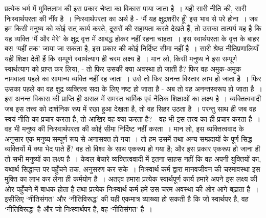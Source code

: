 प्रत्येक धर्म में मुक्तिलाभ की इस प्रकार चेष्टा का विकास पाया जाता है~। यही सारी नीति की, सारी निःस्वार्थपरता की नींव है~। निःस्वार्थपरता का अर्थ है - ‘मैं यह क्षुद्रशरीर हूँ’ इस भाव से परे होना~। जब हम किसी मनुष्य को कोई सत् कार्य करते, दूसरों की सहायता करते देखते हैं, तो उसका तात्पर्य यह है कि यह व्यक्ति ‘मैं और मेरे’ के क्षुद्र वृत्त में आबद्ध होकर नहीं रहना चाहता~। इस स्वार्थपरता के वृत्त के बाहर बस ‘यहीं तक’ जाया जा सकता है, इस प्रकार की कोई निर्दिष्ट सीमा नहीं है~। सारी श्रेष्ठ नीतिप्रणालियाँ यही शिक्षा देती हैं कि सम्पूर्ण स्वार्थत्याग ही चरम लक्ष्य है~। मान लो, किसी मनुष्य ने इस सम्पूर्ण स्वार्थत्याग को प्राप्त कर लिया, - तो फिर उसकी क्या अवस्था हो जाती है? फिर वह अमुक-अमुक नामवाला पहले का सामान्य व्यक्ति नहीं रह जाता~। उसे तो फिर अनन्त विस्तार लाभ हो जाता है~। फिर उसका पहले का वह क्षुद्र व्यक्तित्व सदा के लिए नष्ट हो जाता है - अब तो वह अनन्तस्वरूप हो जाता है~। इस अनन्त विकास की प्राप्ति ही असल में समस्त धार्मिक एवं नैतिक शिक्षाओं का लक्ष्य है~। व्यक्तित्ववादी जब इस तत्त्व को दार्शनिक रूप में रखा हुआ देखता है, तो वह सिहर उठता है~। परन्तु साथ ही जब वह स्वयं नीति का प्रचार करता है, तो आखिर वह क्या करता है? - वह भी इस तत्त्व का ही प्रचार करता है~। वह भी मनुष्य की निःस्वार्थपरता की कोई सीमा निर्दिष्ट नहीं करता~। मान लो, इस व्यक्तित्ववाद के अनुसार एक मनुष्य सम्पूर्ण रूप से अनासक्त हो गया~। तो हम उसमें तथा अन्य सम्प्रदायों के पूर्ण सिद्ध व्यक्तियों में क्या भेद पाते हैं? वह तो विश्व के साथ एकरूप हो गया है; और इस प्रकार एकरूप हो जाना ही तो सभी मनुष्यों का लक्ष्य है~। केवल बेचारे व्यक्तित्ववादी में इतना साहस नहीं कि वह अपनी युक्तियों का, यथार्थ सिद्धान्त पर पहुँचने तक, अनुसरण कर सके~। निःस्वार्थ कर्म द्वारा मानवजीवन की चरमावस्था इस मुक्ति का लाभ कर लेना ही कर्मयोग है~। अतएव हमारा प्रत्येक स्वार्थपूर्ण कार्य हमारे अपने इस लक्ष्य की ओर पहुँचने में बाधक होता है तथा प्रत्येक निःस्वार्थ कर्म हमें उस चरम अवस्था की ओर आगे बढ़ाता है~। इसीलिए ‘नीतिसंगत’ और ‘नीतिविरूद्ध’ की यही एकमात्र व्याख्या हो सकती है कि जो स्वार्थपर है, वह ‘नीतिविरूद्ध’ है और जो निःस्वार्थपर है, वह ‘नीतिसंगत’ है~।

